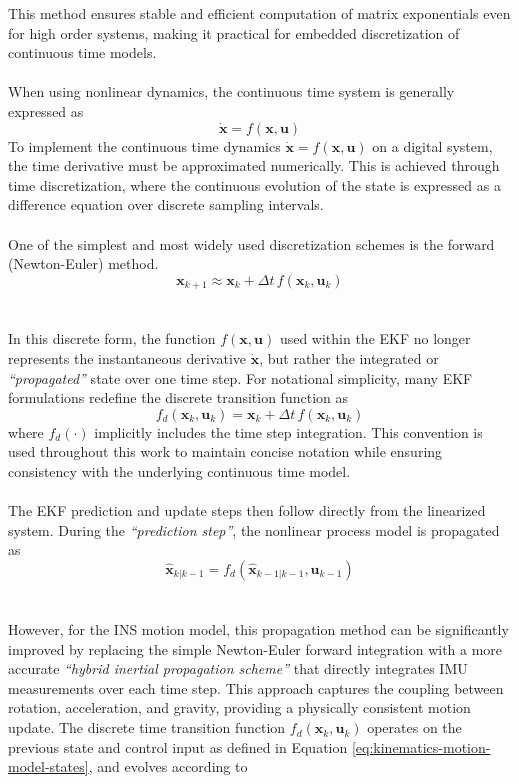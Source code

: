 This method ensures stable and efficient computation of matrix exponentials even for high order systems, making it practical for embedded discretization of continuous time models.  
\\ \\
When using nonlinear dynamics, the continuous time system is generally expressed as
$$
    \dot{\mathbf{x}} = f(\mathbf{x}, \mathbf{u})
$$
To implement the continuous time dynamics $\dot{\mathbf{x}} = f(\mathbf{x}, \mathbf{u})$ on a digital system, the time derivative must be approximated numerically. This is achieved through time discretization, where the continuous evolution of the state is expressed as a difference equation over discrete sampling intervals.  
\\ \\
One of the simplest and most widely used discretization schemes is the forward (Newton-Euler) method.
$$
    \mathbf{x}_{k+1} \approx \mathbf{x}_k + \Delta t \, f(\mathbf{x}_k, \mathbf{u}_k)
$$  
\\ \\
In this discrete form, the function $f(\mathbf{x}, \mathbf{u})$ used within the EKF no longer represents the instantaneous derivative $\dot{\mathbf{x}}$, but rather the integrated or \textit{``propagated''} state over one time step. For notational simplicity, many EKF formulations redefine the discrete transition function as
$$
    f_d(\mathbf{x}_k, \mathbf{u}_k) = \mathbf{x}_k + \Delta t \, f(\mathbf{x}_k, \mathbf{u}_k)
$$
where $f_d(\cdot)$ implicitly includes the time step integration. This convention is used throughout this work to maintain concise notation while ensuring consistency with the underlying continuous time model.
\\ \\
The EKF prediction and update steps then follow directly from the linearized system. During the \textit{``prediction step''}, the nonlinear process model is propagated as
$$
    \hat{\mathbf{x}}_{k|k-1} = f_d(\hat{\mathbf{x}}_{k-1|k-1}, \mathbf{u}_{k-1})
$$
\\ \\
However, for the INS motion model, this propagation method can be significantly improved by replacing the simple Newton-Euler forward integration with a more accurate \textit{``hybrid inertial propagation scheme''} that directly integrates IMU measurements over each time step. This approach captures the coupling between rotation, acceleration, and gravity, providing a physically consistent motion update. The discrete time transition function \( f_d(\mathbf{x}_k, \mathbf{u}_k) \) operates on the previous state and control input as defined in Equation \ref{eq:kinematics-motion-model-states}, and evolves according to
